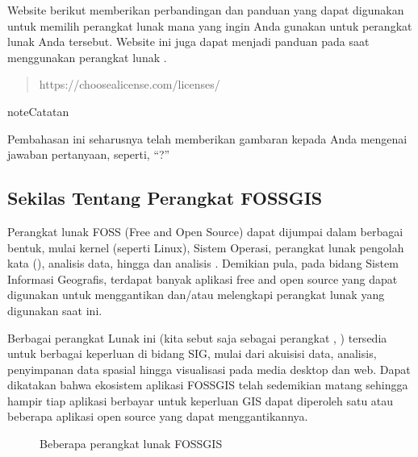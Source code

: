 \documentclass[letterpaper,10pt,english]{sphinxmanual}
\begin{document}
Website berikut memberikan perbandingan dan panduan yang dapat digunakan untuk memilih perangkat lunak mana yang ingin Anda gunakan untuk perangkat lunak Anda tersebut. Website ini juga dapat menjadi panduan pada saat menggunakan perangkat lunak .
\begin{quote}

https://choosealicense.com/licenses/
\end{quote}

\begin{sphinxadmonition}{note}{Catatan}

Pembahasan ini seharusnya telah memberikan gambaran kepada Anda mengenai jawaban pertanyaan, seperti, “?”
\end{sphinxadmonition}


\subsection{Sekilas Tentang Perangkat FOSS\sphinxhyphen{}GIS}
\label{\detokenize{sesi1/fossgis:sekilas-tentang-perangkat-foss-gis}}
Perangkat lunak FOSS (Free and Open Source) dapat dijumpai dalam berbagai bentuk, mulai kernel (seperti Linux), Sistem Operasi, perangkat lunak pengolah kata (), analisis data, hingga  dan analisis . Demikian pula, pada bidang Sistem Informasi Geografis, terdapat banyak aplikasi free and open source yang dapat digunakan untuk menggantikan dan/atau melengkapi perangkat lunak  yang digunakan saat ini.

Berbagai perangkat Lunak ini (kita sebut saja sebagai perangkat , ) tersedia untuk berbagai keperluan di bidang SIG, mulai dari akuisisi data, analisis, penyimpanan data spasial hingga visualisasi pada media desktop dan web. Dapat dikatakan bahwa ekosistem aplikasi FOSS\sphinxhyphen{}GIS telah sedemikian matang sehingga hampir tiap aplikasi berbayar untuk keperluan GIS dapat diperoleh satu atau beberapa aplikasi open source yang dapat menggantikannya.

\begin{figure}[htbp]
\centering
\capstart

\noindent{}
\caption{Beberapa perangkat lunak FOSS\sphinxhyphen{}GIS}\label{\detokenize{sesi1/fossgis:fossgisapp}}\end{figure}
\end{document}
